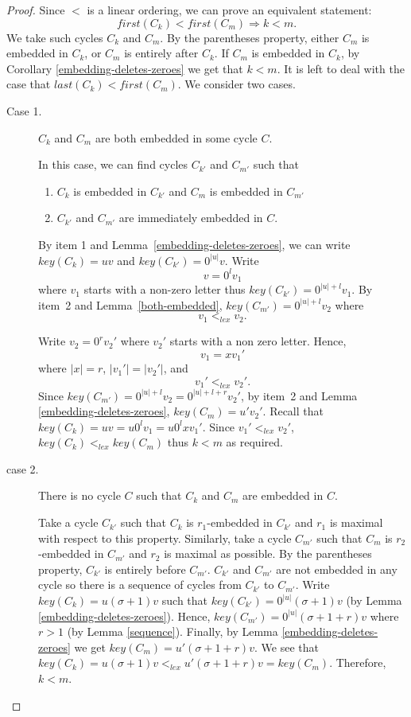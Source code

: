 \documentclass{article}
\theoremstyle{definition}
\begin{document}
\begin{proof}
	Since $<$ is a linear ordering, we can prove an equivalent statement: $$first(C_k)<first(C_m) \Longrightarrow k<m.$$ We take such cycles $C_k$ and $C_m$. By the parentheses property, either $C_m$ is embedded in $C_k$, or $C_m$ is entirely after $C_k$. If $C_m$ is embedded in $C_k$, by Corollary \ref{embedding-deletes-zeroes} we get that $k<m$. It is left to deal with the case that $last(C_k)<first(C_m)$. We consider two cases.
	\begin{description}
		\item[Case 1.] $C_k$ and $C_m$ are both embedded in some cycle $C$.
		
		In this case, we can find cycles $C_{k'}$ and $C_{m'}$ such that
		\begin{enumerate}
			\item $C_k$ is embedded in $C_{k'}$ and $C_{m}$ is embedded in $C_{m'}$
			
			\item $C_{k'}$ and $C_{m'}$ are immediately embedded in $C$.
			
		\end{enumerate}
		
		By item 1 and Lemma~\ref{embedding-deletes-zeroes}, we can write $key(C_k)=uv$ and $key(C_{k'})=0^{|u|}v$. Write 
		$$v=0^lv_1$$ 
		where $v_1$ starts with a non-zero letter thus $key(C_{k'})=0^{|u|+l}v_1$. By item~2 and Lemma~\ref{both-embedded}, $key(C_{m'})=0^{|u|+l}v_2$ where 
		$$v_1<_{lex}v_2.$$
		
		Write $v_2=0^r v_2'$ where $v_2'$ starts with a non zero letter. Hence, $$v_1=xv_1'$$ 
		where $|x|=r$, $|v_1'|=|v_2'|$, and 
		$$v_1'<_{lex} v_2'.$$
		Since $key(C_{m'})=0^{|u|+l}v_2 =0^{|u|+l+r}v_2'$, by item~2 and Lemma \ref{embedding-deletes-zeroes}, $key(C_m)=u'v_2'$. Recall that $key(C_k)=uv=u0^lv_1=u0^lxv_1'$. Since $v_1'<_{lex}v_2'$, $key(C_k)<_{lex}key(C_m)$ thus $k<m$ as required.
		
		\item[case 2.] There is no cycle $C$ such that $C_k$ and $C_m$ are embedded in $C$.
		
		Take a cycle $C_{k'}$ such that $C_k$ is $r_1$-embedded in $C_{k'}$ and $r_1$ is maximal with respect to this property. Similarly, take a cycle $C_{m'}$ such that $C_{m}$ is $r_2$-embedded in $C_{m'}$ and $r_2$ is maximal as possible. By the parentheses property, $C_{k'}$ is entirely before $C_{m'}$. $C_{k'}$ and $C_{m'}$ are not embedded in any cycle so there is a sequence of cycles from $C_{k'}$ to $C_{m'}$. Write $key(C_k)=u(\sigma+1)v$ such that $key(C_{k'})=0^{|u|}(\sigma+1)v$ (by Lemma \ref{embedding-deletes-zeroes}). Hence, $key(C_{m'})=0^{|u|}(\sigma+1+r)v$ where $r>1$ (by Lemma \ref{sequence}). Finally, by Lemma \ref{embedding-deletes-zeroes} we get $key(C_m)=u'(\sigma+1+r)v$. We see that $key(C_k)=u(\sigma+1)v<_{lex}u'(\sigma+1+r)v=key(C_m)$. Therefore, $k<m$.
		
		
	\end{description}
\end{proof}
\end{document}
